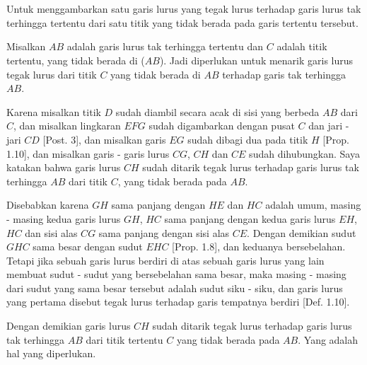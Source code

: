 \documentclass[a4paper]{book}
\begin{document}
\section*{\centering \thesection} 
Untuk menggambarkan satu garis lurus yang tegak lurus terhadap garis
lurus tak terhingga tertentu dari satu titik yang tidak berada pada
garis tertentu tersebut.  
\begin{center}
\end{center} 
Misalkan $AB$ adalah garis lurus tak terhingga tertentu dan $C$ adalah titik 
tertentu, yang tidak berada di ($AB$). Jadi diperlukan untuk menarik garis lurus
tegak lurus dari titik $C$ yang tidak berada di $AB$ terhadap garis tak 
terhingga $AB$.

Karena misalkan titik $D$ sudah diambil secara acak di sisi yang berbeda $AB$ dari
$C$, dan misalkan lingkaran $EFG$ sudah digambarkan dengan pusat $C$ dan 
jari - jari $CD$ [Post. 3], dan misalkan garis $EG$ sudah dibagi dua pada
titik $H$ [Prop. 1.10], dan misalkan garis - garis lurus $CG$, $CH$ dan $CE$
sudah dihubungkan. Saya katakan bahwa garis lurus $CH$ sudah ditarik tegak 
lurus terhadap garis lurus tak terhingga $AB$ dari titik $C$, yang tidak 
berada pada $AB$. 

Disebabkan karena $GH$ sama panjang dengan $HE$ dan $HC$ adalah umum, 
masing - masing kedua garis lurus $GH$, $HC$ sama panjang dengan kedua garis 
lurus  $EH$, $HC$ dan sisi alas $CG$ sama panjang dengan sisi alas $CE$. 
Dengan demikian sudut $GHC$ sama besar dengan sudut $EHC$ [Prop. 1.8], dan 
keduanya  bersebelahan. Tetapi jika sebuah garis lurus berdiri di atas
sebuah garis lurus yang lain membuat sudut - sudut yang bersebelahan 
sama besar, maka masing - masing dari sudut yang sama besar tersebut adalah
sudut siku - siku, dan garis lurus yang pertama disebut tegak lurus terhadap
garis tempatnya berdiri [Def. 1.10].

Dengan demikian garis lurus $CH$ sudah ditarik tegak lurus terhadap garis
lurus tak terhingga $AB$ dari titik tertentu $C$ yang tidak berada pada
$AB$. Yang adalah hal yang diperlukan.
\end{document}
